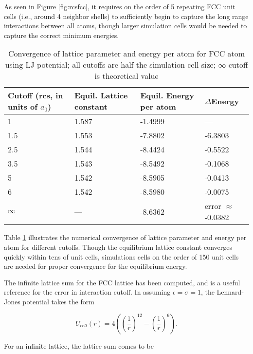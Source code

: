 \documentclass[12pt, oneside]{article}
\begin{document}
As seen in Figure \ref{fig:rcsfcc}, it requires on the order of 5 repeating FCC unit cells (i.e., around 4 neighbor shells) to sufficiently begin to capture the long range interactions between all atoms, though larger simulation cells would be needed to capture the correct minimum energies.
 
 \begin{table}[htbp]
\centering
\caption{Convergence of lattice parameter and energy per atom for FCC atom using LJ potential; all cutoffs are half the simulation cell size;  $\infty$ cutoff is theoretical value}
\label{tab:fcconv}
	\begin{tabular}{llll}
	\hline \hline
                 Cutoff (rcs, in units of $a_0$) &  Equil. Lattice constant & Equil. Energy per atom  & $\Delta$Energy \\
                 \hline 
                    1	&  1.587	& -1.4999  	& ---	\\
                   1.5	&  1.553	& -7.8802   	& -6.3803	\\
                   2.5	&  1.544	& -8.4424   	& -0.5522	\\
                   3.5	&  1.543	& -8.5492   	& -0.1068	\\
                    5	&  1.542	& -8.5905   	& -0.0413	\\
                    6  &   1.542   &  -8.5980         & -0.0075 \\
	  \hline
	       $\infty$     & ---	& -8.6362 	& error $\approx$ -0.0382 	\\
	\hline \hline	
\end{tabular}
\end{table}

Table \ref{tab:fcconv} illustrates the numerical convergence of lattice parameter and energy per atom for different cutoffs. Though the equilibrium lattice constant converges quickly within tens of unit cells, simulations cells on the order of 150 unit cells are needed for proper convergence for the equilibrium energy. 

The infinite lattice sum for the FCC lattice has been computed, and is a useful reference for the error in interaction cutoff. In assuming $\epsilon = \sigma = 1$, the Lennard-Jones potential takes the form

\begin{equation} 
  U_{cell}(r) = 4((\frac{1}{r})^{12} - (\frac{1}{r})^6).
\end{equation} 

For an infinite lattice, the lattice sum comes to be 
\end{document}
